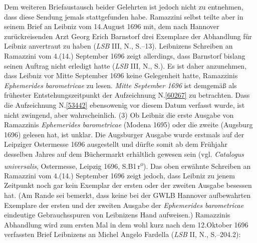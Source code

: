 Dem weiteren Briefaustausch beider Gelehrten ist jedoch nicht zu entnehmen, dass diese Sendung jemals stattgefunden habe.
Ramazzini selbst teilte aber in seinem Brief an Leibniz vom 14.\;August 1696 mit, dem nach Hannover zurückreisenden Arzt Georg Erich Barnstorf drei Exemplare der Abhandlung\cite{01516} %
für Leibniz anvertraut zu haben (\textit{LSB} III, N., S.--13).\cite{01442}
Leibnizens Schreiben an Ramazzini vom 4.\;(14.) September 1696 zeigt allerdings, dass Barnstorf bislang seinen Auftrag nicht erledigt hatte (\textit{LSB} III, N., S.).\cite{01446}
Es ist daher anzunehmen, dass Leibniz vor Mitte September 1696 keine Gelegenheit hatte, Ramazzinis \textit{Ephemerides barometricae}\cite{01516}\cite{01517} zu lesen.
\textit{Mitte September 1696} ist demgemäß als frühester Entstehungszeitpunkt der Aufzeichnung N.\;\ref{60267} zu betrachten.
Dass die Aufzeichnung N.\;\ref{53442} ebensowenig vor diesem Datum verfasst wurde, ist nicht zwingend, aber wahrscheinlich.
\pend%
\pstart%
(3)
Ob Leibniz die erste Ausgabe von Ramazzinis \textit{Ephemerides barometricae} (Modena 1695)\cite{01516} oder die zweite (Augsburg 1696)\cite{01517} gelesen hat, ist unklar.
Die Augsburger Ausgabe wurde erstmals auf der Leipziger Ostermesse 1696 ausgestellt und dürfte somit ab dem Frühjahr desselben Jahres auf dem Büchermarkt erhältlich gewesen sein (vgl. \textit{Catalogus universalis}, Ostermesse, Leipzig 1696, S.\;B1\,r\textsuperscript{o}).\cite{02578}
Das oben erwähnte Schreiben an Ramazzini vom 4.\;(14.) September 1696 zeigt jedoch, dass Leibniz zu jenem Zeitpunkt noch gar kein Exemplar der ersten oder der zweiten Ausgabe besessen hat.
(Am Rande sei bemerkt, dass keine bei der GWLB Hannover aufbewahrten Exemplare der ersten und der zweiten Ausgabe der \textit{Ephemerides barometricae}\cite{01516}\cite{01517} eindeutige Gebrauchsspuren von Leibnizens Hand aufweisen.)
Ramazzinis Abhandlung wird zum ersten Mal in dem wohl kurz nach dem 12.\;Oktober 1696 verfassten Brief Leibnizens an Michel Angelo Fardella (\textit{LSB} II, N., S.--204.2):\cite{01443}
